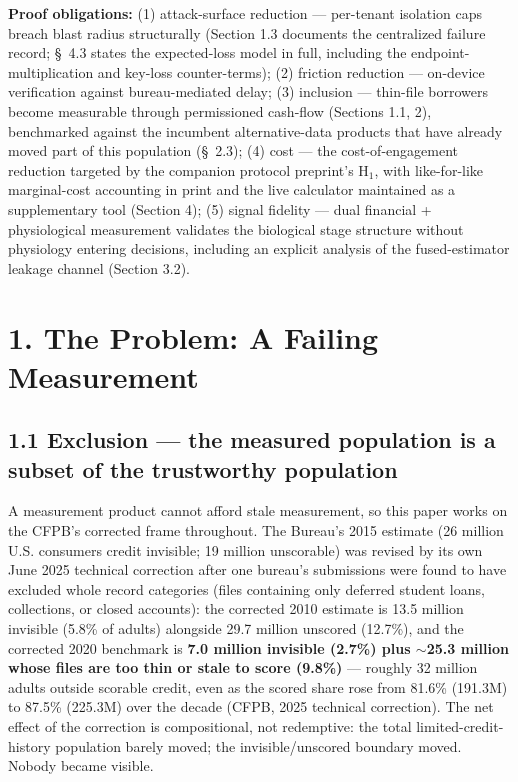 \documentclass[11pt,twocolumn]{article}
\begin{document}
\textbf{Proof obligations:} (1) attack-surface reduction --- per-tenant isolation caps breach blast radius structurally (Section 1.3 documents the centralized failure record; \S~4.3 states the expected-loss model in full, including the endpoint-multiplication and key-loss counter-terms); (2) friction reduction --- on-device verification against bureau-mediated delay; (3) inclusion --- thin-file borrowers become measurable through permissioned cash-flow (Sections 1.1, 2), benchmarked against the incumbent alternative-data products that have already moved part of this population (\S~2.3); (4) cost --- the cost-of-engagement reduction targeted by the companion protocol preprint's $\mathrm{H}_1$, with like-for-like marginal-cost accounting in print and the live calculator maintained as a supplementary tool (Section 4); (5) signal fidelity --- dual financial + physiological measurement validates the biological stage structure without physiology entering decisions, including an explicit analysis of the fused-estimator leakage channel (Section 3.2).

\section*{1. The Problem: A Failing Measurement}

\subsection*{1.1 Exclusion --- the measured population is a subset of the trustworthy population}

A measurement product cannot afford stale measurement, so this paper works on the CFPB's corrected frame throughout. The Bureau's 2015 estimate (26 million U.S. consumers credit invisible; 19 million unscorable) was revised by its own June 2025 technical correction after one bureau's submissions were found to have excluded whole record categories (files containing only deferred student loans, collections, or closed accounts): the corrected 2010 estimate is 13.5 million invisible (5.8\% of adults) alongside 29.7 million unscored (12.7\%), and the corrected 2020 benchmark is \textbf{7.0 million invisible (2.7\%) plus $\sim$25.3 million whose files are too thin or stale to score (9.8\%)} --- roughly 32 million adults outside scorable credit, even as the scored share rose from 81.6\% (191.3M) to 87.5\% (225.3M) over the decade (CFPB, 2025 technical correction). The net effect of the correction is compositional, not redemptive: the total limited-credit-history population barely moved; the invisible/unscored boundary moved. Nobody became visible.
\end{document}
